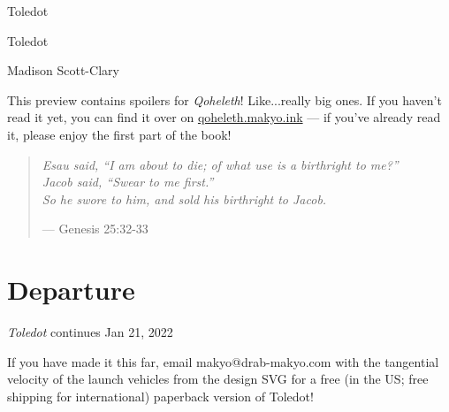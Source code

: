 \documentclass[11pt]{memoir}
\begin{document}
  \frontmatter

  \thispagestyle{empty}
  \null
  \vfill
  \begin{flushright}
    \DisplayFont Toledot
  \end{flushright}
  \vfill
  \cleardoublepage

  \pagestyle{plain}

  \doublespacing

  \begin{flushright}
    \null
    \vfill
    {\Huge\DisplayFont Toledot}

    \vfill

    {\Large\DisplayFont Madison Scott-Clary}
  \end{flushright}
  \thispagestyle{empty}

  \newpage
  \null
  \vfill
  This preview contains spoilers for \emph{Qoheleth}! Like...really big ones. If you haven't read it yet, you can find it over on \mbox{\href{https://qoheleth.makyo.ink}{qoheleth.makyo.ink}} --- if you've already read it, please enjoy the first part of the book!
  \vfill

  \newpage
  \null
  \cleardoublepage

  \onehalfspacing


  \mainmatter

  \pagestyle{ourbook}

  \cleardoublepage
  \null
  \thispagestyle{empty}
  \vfill
  \begin{quote}
    \small
    \emph{Esau said, ``I am about to die; of what use is a birthright to me?'' \\
    Jacob said, ``Swear to me first.'' \\
    So he swore to him, and sold his birthright to Jacob.}

    --- Genesis 25:32-33
  \end{quote}
  \vfill

  \part{Departure}
  

  \backmatter
  \null
  \vfill
  \emph{Toledot} continues Jan 21, 2022

  If you have made it this far, email makyo@drab-makyo.com with the tangential velocity of the launch vehicles from the design SVG for a free (in the US; free shipping for international) paperback version of Toledot!
  \vfill

  \markboth{}{}


\end{document}
